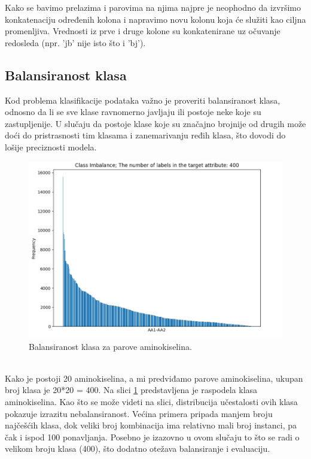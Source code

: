 \documentclass[a4paper,12pt]{article}
\begin{document}
Kako se bavimo prelazima i parovima na njima najpre je neophodno da izvršimo konkatenaciju određenih kolona i napravimo novu kolonu koja će služiti kao ciljna promenljiva. Vrednosti iz prve i druge kolone su konkatenirane uz očuvanje redosleda (npr. 'jb' nije isto što i 'bj').

\subsection{Balansiranost klasa}
Kod problema klasifikacije podataka važno je proveriti balansiranost klasa, odnosno da li se sve klase ravnomerno javljaju ili postoje neke koje su zastupljenije. U slučaju da postoje klase koje su značajno brojnije od drugih može doći do pristrasnosti tim klasama i zanemarivanju ređih klasa, što dovodi do lošije preciznosti modela.
\\
\begin{figure}[htbp]
    \centering
    \includegraphics[width=1\textwidth]{./images/aa_imbalance.png}
    \caption{Balansiranost klasa za parove aminokiselina.}
    \label{Slika:aa_imbalance}
\end{figure}
\\
Kako je postoji 20 aminokiselina, a mi predviđamo parove aminokiselina, ukupan broj klasa je 20*20 = 400. Na slici \ref{Slika:aa_imbalance} predstavljena je raspodela klasa aminokiselina.
Kao što se može videti na slici, distribucija učestalosti ovih klasa pokazuje izrazitu nebalansiranost. Većina primera pripada manjem broju najčešćih klasa, dok veliki broj kombinacija ima relativno mali broj instanci, pa čak i ispod 100 ponavljanja. Posebno je izazovno u ovom slučaju to što se radi o velikom broju klasa (400), što dodatno otežava balansiranje i evaluaciju.
\end{document}

